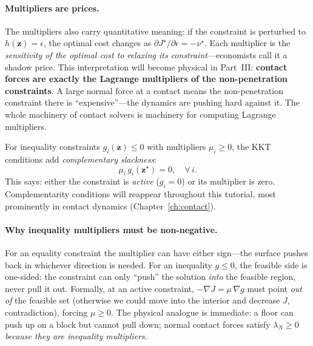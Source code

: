 \documentclass[11pt,twoside]{report}
\theoremstyle{definition}
\theoremstyle{plain}
\theoremstyle{remark}
\newcommand{\0}{\bm{0}}
\begin{document}
\paragraph{Multipliers are prices.}
The multipliers also carry quantitative meaning: if the constraint is
perturbed to $h(\bm{z})=\epsilon$, the optimal cost changes as
$\partial J^{\star}/\partial\epsilon=-\nu^{\star}$.
Each multiplier is the \emph{sensitivity of the optimal cost to relaxing
its constraint}---economists call it a shadow price.
This interpretation will become physical in Part~III:
\textbf{contact forces are exactly the Lagrange multipliers of the
non-penetration constraints}. A large normal force at a contact means
the non-penetration constraint there is ``expensive''---the dynamics
are pushing hard against it. The whole machinery of contact solvers is
machinery for computing Lagrange multipliers.

For inequality constraints $g_{i}(\bm{z})\le 0$ with multipliers $\mu_{i}\ge 0$,
the KKT conditions add \emph{complementary slackness}:
\begin{equation}\label{eq:comp-slack}
\mu_{i}\,g_{i}(\bm{z}^{\star})=0,\quad\forall\,i.
\end{equation}
This says: either the constraint is \emph{active} ($g_{i}=0$) or its multiplier is zero.
Complementarity conditions will reappear throughout this tutorial, most prominently in contact dynamics (Chapter~\ref{ch:contact}).

\paragraph{Why inequality multipliers must be non-negative.}
For an equality constraint the multiplier can have either sign---the
surface pushes back in whichever direction is needed. For an inequality
$g\le 0$, the feasible side is one-sided: the constraint can only
``push'' the solution \emph{into} the feasible region, never pull it out.
Formally, at an active constraint, $-\nabla J=\mu\,\nabla g$ must point
\emph{out of} the feasible set (otherwise we could move into the
interior and decrease $J$, contradiction), forcing $\mu\ge 0$.
The physical analogue is immediate: a floor can push up on a block but
cannot pull down; normal contact forces satisfy $\lambda_{N}\ge 0$
\emph{because they are inequality multipliers}.
\end{document}
